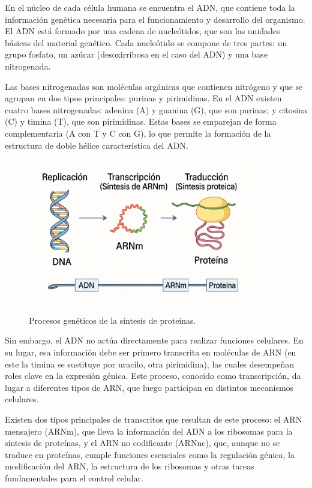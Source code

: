 \documentclass[11pt,spanish,listoffigures,listoftables]{tfgetsinf}
\begin{document}
En el núcleo de cada célula humana se encuentra el \ac{ADN}, que contiene toda la información genética necesaria para el funcionamiento y desarrollo del organismo. El \ac{ADN} está formado por una cadena de nucleótidos, que son las unidades básicas del material genético. Cada nucleótido se compone de tres partes: un grupo fosfato, un azúcar (desoxirribosa en el caso del ADN) y una base nitrogenada.

Las bases nitrogenadas son moléculas orgánicas que contienen nitrógeno y que se agrupan en dos tipos principales: purinas y pirimidinas. En el \ac{ADN} existen cuatro bases nitrogenadas: adenina (A) y guanina (G), que son purinas; y citosina (C) y timina (T), que son pirimidinas. Estas bases se emparejan de forma complementaria (A con T y C con G), lo que permite la formación de la estructura de doble hélice característica del \ac{ADN}\cite{GEN}.


\begin{figure}[H]
   \centering
   \includegraphics[width=0.9\textwidth]{ADN.png}
   \caption{Procesos genéticos de la síntesis de proteínas.}
   \label{fig:etiqueta_opcional1}
\end{figure}

Sin embargo, el \ac{ADN} no actúa directamente para realizar funciones celulares. En su lugar, esa información debe ser primero transcrita en moléculas de \ac{ARN} (en este la timina se sustituye por uracilo, otra pirimidina), las cuales desempeñan roles clave en la expresión génica. Este proceso, conocido como transcripción, da lugar a diferentes tipos de \ac{ARN}, que luego participan en distintos mecanismos celulares.

Existen dos tipos principales de transcritos que resultan de este proceso: el \ac{ARN} mensajero (\ac{ARN}m), que lleva la información del \ac{ADN} a los ribosomas para la síntesis de proteínas, y el \ac{ARN} no codificante (ARNnc), que, aunque no se traduce en proteínas, cumple funciones esenciales como la regulación génica, la modificación del \ac{ARN}, la estructura de los ribosomas y otras tareas fundamentales para el control celular\cite[p.~254-300]{WAT}. 
\end{document}
